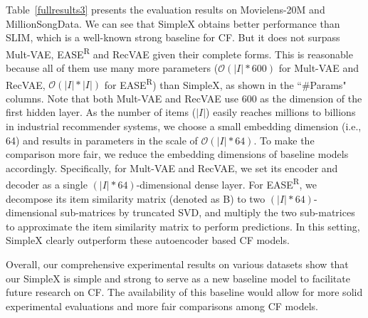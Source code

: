 \documentclass[sigconf,authorversion]{acmart}
\begin{document}
Table~\ref{fullresults3} presents the evaluation results on Movielens-20M and MillionSongData. We can see that SimpleX obtains better performance than SLIM, which is a well-known strong baseline for CF. But it does not surpass Mult-VAE, EASE\textsuperscript{R} and RecVAE given their complete forms. This is reasonable because all of them use many more parameters ($\mathcal{O}(|I| * 600)$ for Mult-VAE and RecVAE, $\mathcal{O}(|I| * |I|)$ for EASE\textsuperscript{R}) than SimpleX, as shown in the ``\#Params" columns. Note that both Mult-VAE and RecVAE use 600 as the dimension of the first hidden layer. As the number of items ($|I|$) easily reaches  millions to billions in industrial recommender systems, we choose a small embedding dimension (i.e., 64) and results in parameters in the scale of $\mathcal{O}(|I| * 64)$. To make the comparison more fair, we reduce the embedding dimensions of baseline models accordingly. Specifically, for Mult-VAE and RecVAE, we set its encoder and decoder as a single $(|I| * 64)$-dimensional dense layer. For EASE\textsuperscript{R}, we decompose its item similarity matrix (denoted as B) to two $(|I| * 64)$-dimensional sub-matrices by truncated SVD, and multiply the two sub-matrices to approximate the item similarity matrix to perform predictions. In this setting, SimpleX clearly outperform these autoencoder based CF models.

Overall, our comprehensive experimental results on various datasets show that our SimpleX is simple and strong to serve as a new baseline model to facilitate future research on CF. The availability of this baseline would allow for more solid experimental evaluations and more fair comparisons among CF models. 

































 





%
\end{document}
